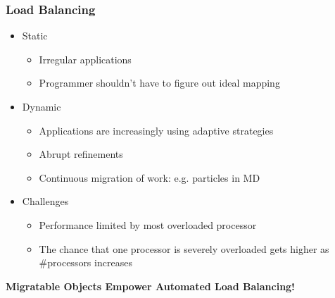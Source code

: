
\begin{frame}[fragile]
\frametitle{Load Balancing}
\begin{itemize}
 \item Static
   \begin{itemize}
   \item Irregular applications
   \item Programmer shouldn't have to figure out ideal mapping
   \end{itemize}
 \item Dynamic
   \begin{itemize}
   \item Applications are increasingly using adaptive strategies
   \item Abrupt refinements
   \item Continuous migration of work: e.g. particles in MD
   \end{itemize}
 \item Challenges
   \begin{itemize}
   \item Performance limited by most overloaded processor
   \item The chance that one processor is severely overloaded gets higher as
     \#processors increases
   \end{itemize}
\end{itemize}
\begin{center}\textbf{Migratable Objects Empower Automated Load Balancing!}\end{center}
\end{frame}




